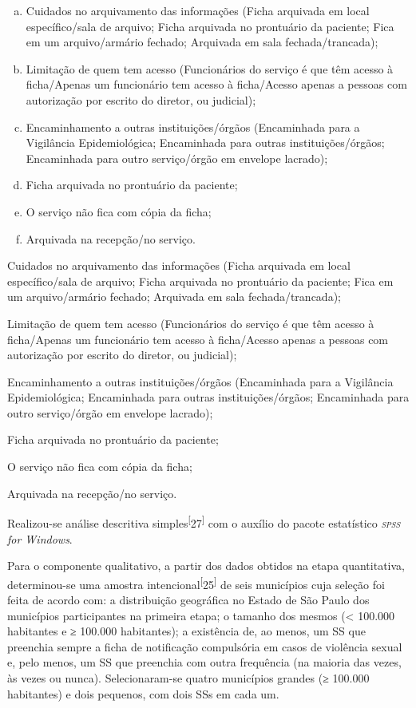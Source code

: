 \documentclass{article}
\begin{document}
\begin{enumerate}[a)]
\item
Cuidados no arquivamento das informações (Ficha arquivada em local
específico/sala de arquivo; Ficha arquivada no prontuário da paciente; Fica em
um arquivo/armário fechado; Arquivada em sala fechada/trancada);

\item
Limitação de quem tem acesso (Funcionários do serviço é que têm acesso à
ficha/Apenas um funcionário tem acesso à ficha/Acesso apenas a pessoas com
autorização por escrito do diretor, ou judicial);

\item
Encaminhamento a outras instituições/órgãos (Encaminhada para a Vigilância
Epidemiológica; Encaminhada para outras instituições/órgãos; Encaminhada para
outro serviço/órgão em envelope lacrado);

\item
Ficha arquivada no prontuário da paciente;

\item
O serviço não fica com cópia da ficha;

\item
Arquivada na recepção/no serviço.

\end{enumerate}

Cuidados no arquivamento das informações (Ficha arquivada em local
específico/sala de arquivo; Ficha arquivada no prontuário da paciente; Fica em
um arquivo/armário fechado; Arquivada em sala fechada/trancada);

Limitação de quem tem acesso (Funcionários do serviço é que têm acesso à
ficha/Apenas um funcionário tem acesso à ficha/Acesso apenas a pessoas com
autorização por escrito do diretor, ou judicial);

Encaminhamento a outras instituições/órgãos (Encaminhada para a Vigilância
Epidemiológica; Encaminhada para outras instituições/órgãos; Encaminhada para
outro serviço/órgão em envelope lacrado);

Ficha arquivada no prontuário da paciente;

O serviço não fica com cópia da ficha;

Arquivada na recepção/no serviço.

Realizou-se análise descritiva simples\textsuperscript{[}27\textsuperscript{]}
com o auxílio do pacote estatístico \textit{\textsc{spss} for Windows}.

Para o componente qualitativo, a partir dos dados obtidos na etapa quantitativa,
determinou-se uma amostra intencional\textsuperscript{[}25\textsuperscript{]}
de seis municípios cuja seleção foi feita de acordo com: a distribuição
geográfica no Estado de São Paulo dos municípios participantes na primeira
etapa; o tamanho dos mesmos (< 100.000 habitantes e ≥ 100.000 habitantes); a
existência de, ao menos, um SS que preenchia sempre a ficha de notificação
compulsória em casos de violência sexual e, pelo menos, um SS que preenchia com
outra frequência (na maioria das vezes, às vezes ou nunca). Selecionaram-se
quatro municípios grandes (≥ 100.000 habitantes) e dois pequenos, com dois SSs
em cada um.
\end{document}
